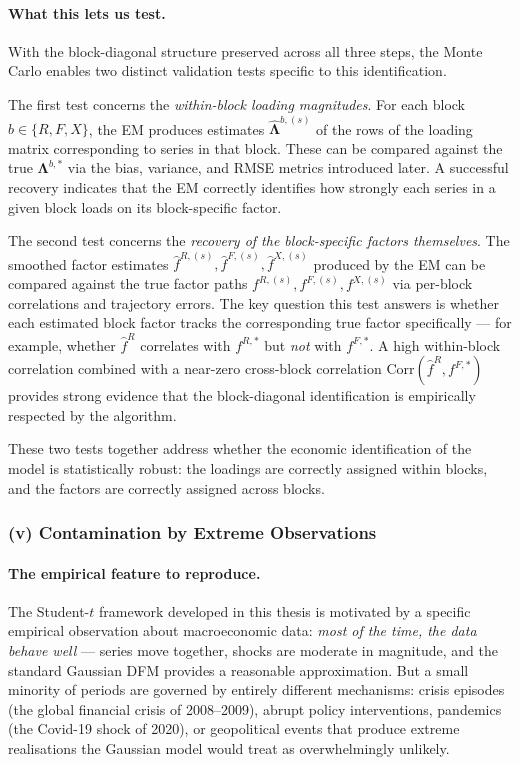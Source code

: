 \documentclass[11pt, a4paper, oneside]{article}
\newcommand{\mL}{\boldsymbol{\Lambda}}
\begin{document}
\paragraph{What this lets us test.}
With the block-diagonal structure preserved across all three
steps, the Monte Carlo enables two distinct validation tests
specific to this identification.

The first test concerns the \emph{within-block loading magnitudes}.
For each block $b \in \{R, F, X\}$, the EM produces estimates
$\hat{\mL}^{b, (s)}$ of the rows of the loading matrix
corresponding to series in that block. These can be compared
against the true $\mL^{b, *}$ via the bias, variance, and RMSE
metrics introduced later. A successful recovery indicates that the
EM correctly identifies how strongly each series in a given block
loads on its block-specific factor.

The second test concerns the \emph{recovery of the block-specific
factors themselves}. The smoothed factor estimates
$\hat{f}^{R, (s)}, \hat{f}^{F, (s)}, \hat{f}^{X, (s)}$ produced by
the EM can be compared against the true factor paths
$f^{R, (s)}, f^{F, (s)}, f^{X, (s)}$ via per-block correlations
and trajectory errors. The key question this test answers is
whether each estimated block factor tracks the corresponding true
factor specifically — for example, whether $\hat{f}^R$ correlates
with $f^{R, *}$ but \emph{not} with $f^{F, *}$. A high
within-block correlation combined with a near-zero cross-block
correlation
$\mathrm{Corr}(\hat{f}^R, f^{F, *})$ provides strong evidence
that the block-diagonal identification is empirically respected
by the algorithm.

These two tests together address whether the economic
identification of the model is statistically robust: the loadings
are correctly assigned within blocks, and the factors are
correctly assigned across blocks.

\subsubsection*{(v) Contamination by Extreme Observations}
\label{subsubsec:sim-contamination}

\paragraph{The empirical feature to reproduce.}
The Student-$t$ framework developed in this thesis is motivated by
a specific empirical observation about macroeconomic data:
\emph{most of the time, the data behave well} — series move
together, shocks are moderate in magnitude, and the standard
Gaussian DFM provides a reasonable approximation. But a small
minority of periods are governed by entirely different mechanisms:
crisis episodes (the global financial crisis of 2008--2009),
abrupt policy interventions, pandemics (the Covid-19 shock of
2020), or geopolitical events that produce extreme realisations
the Gaussian model would treat as overwhelmingly unlikely.
\end{document}
